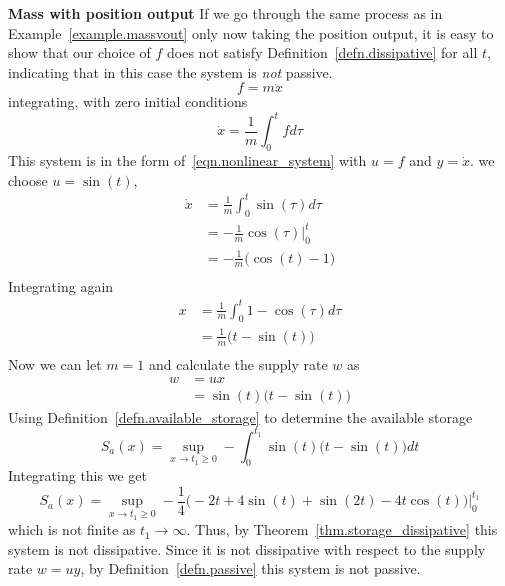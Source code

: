\begin{example}
  \textbf{Mass with position output}
  If we go through the same process as in Example~\ref{example.massvout} only now taking the position output, it is easy to show that our choice of $f$ does not satisfy Definition~\ref{defn.dissipative} for all $t$, indicating that in this case the system is \textit{not} passive.
  \begin{equation*}
    f = m \ddot{x}
  \end{equation*}
  integrating, with zero initial conditions
  \begin{equation*}
    \dot{x} = \frac{1}{m} \int_{0}^{t}f d\tau
  \end{equation*}
  This system is in the form of~\eqref{eqn.nonlinear_system} with $u=f$ and $y=\dot{x}$.
   we choose $u=\sin(t)$,
  \begin{equation*}
    \begin{split}
      \dot{x} &= \frac{1}{m} \int_{0}^{t}\sin(\tau) d\tau \\
      &= -\frac{1}{m} \cos(\tau)\bigr|_{0}^{t} \\
      &= -\frac{1}{m} \bigr(\cos(t) - 1\bigr) \\
    \end{split}
  \end{equation*}
  Integrating again
  \begin{equation*}
    \begin{split}
      x &= \frac{1}{m} \int_{0}^{t} 1 - \cos(\tau) d\tau \\
      &= \frac{1}{m}\bigr(t - \sin(t)\bigr) \\
    \end{split}
  \end{equation*}
  Now we can let $m=1$ and calculate the supply rate $w$ as
  \begin{equation*}
    \begin{split}
      w &= ux \\
      &= \sin(t)\bigr(t - \sin(t)\bigr)
    \end{split}
  \end{equation*}
  Using Definition~\ref{defn.available_storage} to determine the available storage
  \begin{equation*}
    S_{a}(x) = \sup_{x\rightarrow t_{1}\geq 0} -\int_{0}^{t_{1}}\sin(t)\bigr(t - \sin(t)\bigr)dt
  \end{equation*}
  Integrating this we get
  \begin{equation*}
    S_{a}(x) = \sup_{x\rightarrow t_{1}\geq 0} -\frac{1}{4}\bigr(-2t+4\sin(t)+\sin(2t)-4t\cos(t)\bigr)\biggr|_{0}^{t_{1}}
  \end{equation*}
  which is not finite as $t_{1}\rightarrow\infty$.
  Thus, by Theorem~\ref{thm.storage_dissipative} this system is not dissipative.
  Since it is not dissipative with respect to the supply rate $w=uy$, by Definition~\ref{defn.passive} this system is not passive.


\end{example}
